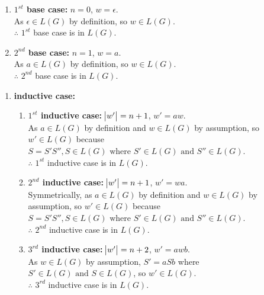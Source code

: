 \documentclass[11pt]{article}
\begin{document}
\begin{enumerate}
\begin{enumerate}
\begin{enumerate}
\begin{enumerate}
            \item \textbf{$1^{st}$ base case:} $n = 0$, $w = \epsilon$. \\
            As $\epsilon \in L(G)$ by definition, so $w \in L(G)$. \\
            $\therefore$ $1^{st}$ base case is in $L(G)$.
            
            \item \textbf{$2^{nd}$ base case:} $n = 1$, $w = a$. \\
            As $a \in L(G)$ by definition, so $w \in L(G)$. \\
            $\therefore$ $2^{nd}$ base case is in $L(G)$.
            
        \end{enumerate}
        
    \end{enumerate}
    
    \begin{enumerate}
        \item \textbf{inductive case:}
    
        \begin{enumerate}
    
            \item \textbf{$1^{st}$ inductive case:} $\abs{w'} = n + 1$, $w' = aw$. \\
            As $a \in L(G)$ by definition and $w \in L(G)$ by assumption,  so $w' \in L(G)$ because $S = S'S'', S \in L(G) \text{ where } S' \in L(G) \text{ and } S'' \in L(G)$. \\
            $\therefore$ $1^{st}$ inductive case is in $L(G)$.
            
            \item \textbf{$2^{nd}$ inductive case:} $\abs{w'} = n + 1$, $w' = wa$. \\
            Symmetrically, as $a \in L(G)$ by definition and $w \in L(G)$ by assumption,  so $w' \in L(G)$ because $S = S'S'', S \in L(G) \text{ where } S' \in L(G) \text{ and } S'' \in L(G)$. \\
            $\therefore$ $2^{nd}$ inductive case is in $L(G)$.
            
            \item \textbf{$3^{rd}$ inductive case:} $\abs{w'} = n + 2$, $w' = awb$. \\
            As $w \in L(G)$ by assumption, $S' = aSb$ where $S' \in L(G) \text{ and } S \in L(G)$, so $w' \in L(G)$. \\
            $\therefore$ $3^{rd}$ inductive case is in $L(G)$.
            

\end{enumerate}
\end{enumerate}
\end{enumerate}
\end{enumerate}
\end{document}
